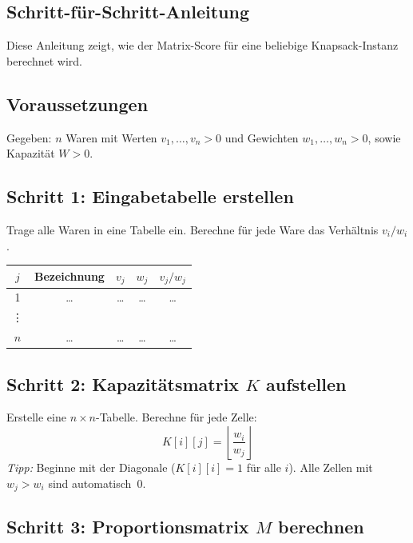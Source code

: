 \documentclass[a4paper,11pt]{article}
\begin{document}
\clearpage
\begin{appendices}
\section{Schritt-für-Schritt-Anleitung}
\label{app:anleitung}

Diese Anleitung zeigt, wie der Matrix-Score für eine beliebige
Knapsack-Instanz berechnet wird.

\subsection*{Voraussetzungen}

Gegeben: $n$ Waren mit Werten $v_1,\ldots,v_n > 0$
und Gewichten $w_1,\ldots,w_n > 0$, sowie Kapazität $W > 0$.

\subsection*{Schritt 1: Eingabetabelle erstellen}

Trage alle Waren in eine Tabelle ein.
Berechne für jede Ware das Verhältnis $v_i/w_i$.

\begin{center}
\small
\begin{tabular}{ccccc}
\toprule
$j$ & Bezeichnung & $v_j$ & $w_j$ & $v_j/w_j$ \\
\midrule
1 & \ldots & \ldots & \ldots & \ldots \\
\vdots & & & & \\
$n$ & \ldots & \ldots & \ldots & \ldots \\
\bottomrule
\end{tabular}
\end{center}

\subsection*{Schritt 2: Kapazitätsmatrix $K$ aufstellen}

Erstelle eine $n \times n$-Tabelle. Berechne für jede Zelle:
\[
K[i][j] = \left\lfloor \frac{w_i}{w_j} \right\rfloor
\]
\textit{Tipp:} Beginne mit der Diagonale ($K[i][i] = 1$ für alle $i$).
Alle Zellen mit $w_j > w_i$ sind automatisch~$0$.

\subsection*{Schritt 3: Proportionsmatrix $M$ berechnen}


\end{appendices}
\end{document}
